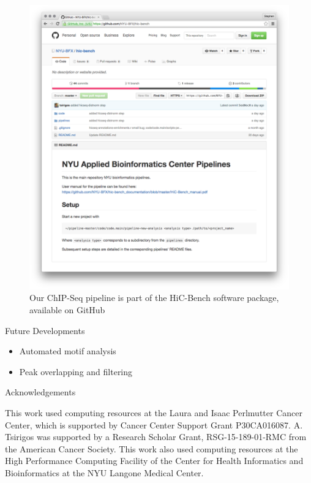\documentclass[final]{beamer}
\newlength{\onecolwid}
\begin{document}
\begin{frame}[t]
\begin{columns}[t]
\begin{column}{\onecolwid}
\begin{figure}
\includegraphics[width=1.0\linewidth]{./Figures/github_repo}
\caption{Our ChIP-Seq pipeline is part of the HiC-Bench software package, available on GitHub}
\label{fig:github_repo}
\end{figure}

\vspace{2.5cm}
\begin{beamerboxesrounded}{Future Developments}
\begin{itemize}
\item Automated motif analysis
\item Peak overlapping and filtering
\end{itemize}
\end{beamerboxesrounded}\hfill

\begin{beamerboxesrounded}{Acknowledgements}

This work used computing resources at the Laura and Isaac Perlmutter Cancer Center, which is supported by Cancer Center Support Grant P30CA016087.
A. Tsirigos was supported by a Research Scholar Grant, RSG-15-189-01-RMC
from the American Cancer Society. 
This work also used computing resources at the High Performance Computing Facility of the Center for Health Informatics and Bioinformatics at the NYU Langone Medical Center. \\


\end{beamerboxesrounded}
\end{column}
\end{columns}
\end{frame}
\end{document}
